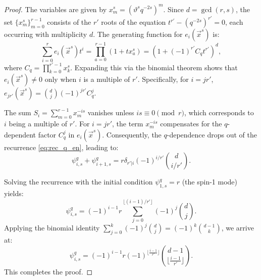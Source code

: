 \documentclass[10pt,a4paper]{amsart}
\renewcommand{\theta}{\vartheta}
\begin{document}
\begin{proof}
					{The variables are given by $x_m^s = (\theta^s q^{-2s})^m$. Since $d = \gcd(r, s)$, the set $\{x_m^s\}_{m=0}^{r-1}$ consists of the $r'$ roots of the equation $t^{r'} - (q^{-2s})^{r'} = 0$, each occurring with multiplicity $d$. The generating function for $e_i(\vec{{x}}^s)$ is:
						\begin{equation}
							\sum_{i=0}^r e_i(\vec{{x}}^s) t^i = \prod_{a=0}^{r-1} (1 + t x_a^s) = \left( 1 + (-1)^{r'} C_q t^{r'} \right)^d,
						\end{equation}
						where $C_q = \prod_{k=0}^{r'-1} x_k^s$. Expanding this via the binomial theorem shows that $e_i(\vec{{x}}^s) \neq 0$ only when $i$ is a multiple of $r'$. Specifically, for $i = j r'$, $e_{jr'}(\vec{{x}}^s) = \binom{d}{j} (-1)^{j r'} C_q^j$.}
					
					{The sum $S_i = \sum_{m=0}^{r-1} x_m^{-is}$ vanishes unless $is \equiv 0 \pmod{r}$, which corresponds to $i$ being a multiple of $r'$. For $i = j r'$, the term $x_m^{-is}$ compensates for the $q$-dependent factor $C_q^j$ in $e_i(\vec{{x}}^s)$. Consequently, the $q$-dependence drops out of the recurrence \eqref{eq:rec_q_en}, leading to:
						\begin{equation}
							\psi_{i,s}^q + \psi_{i+1,s}^q = r \delta_{r'|i} (-1)^{i/r'} \binom{d}{i/r'}.
					\end{equation}}
					
					{Solving the recurrence with the initial condition $\psi_{1,s}^q = r$ (the spin-1 mode) yields:
						\begin{equation}
							\psi_{i,s}^q = (-1)^{i-1} r \sum_{j=0}^{\lfloor (i-1)/r' \rfloor} (-1)^j \binom{d}{j}.
						\end{equation}
						Applying the binomial identity $\sum_{j=0}^k (-1)^j \binom{d}{j} = (-1)^k \binom{d-1}{k}$, we arrive at:
						\begin{equation}
							\psi_{i,s}^q = (-1)^{i-1} r (-1)^{\lfloor \frac{i-1}{r'} \rfloor} \binom{d-1}{\lfloor \frac{i-1}{r'} \rfloor}.
						\end{equation}
						This completes the proof.}
				\end{proof}
\end{document}
